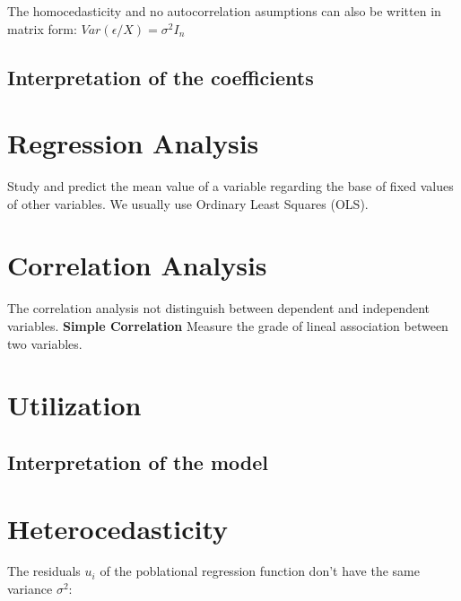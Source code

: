 \documentclass[10pt,landscape]{article}
\begin{document}
\begin{multicols}{3}
The homocedasticity and no autocorrelation asumptions can also be written in matrix form: $Var(\epsilon / X) = \sigma^2 I_n$

\subsection*{Interpretation of the coefficients}




\section*{Regression Analysis}
Study and predict the mean value of a variable regarding the base of fixed values of other variables.
We usually use Ordinary Least Squares (OLS).

\section*{Correlation Analysis}
The correlation analysis not distinguish between dependent and independent variables.
\textbf{Simple Correlation}
Measure the grade of lineal association between two variables.

\section*{Utilization}
\subsection*{Interpretation of the model}


\section*{Heterocedasticity}
The residuals $u_i$ of the poblational regression function don't have the same variance $\sigma^2$:


\end{multicols}
\end{document}
